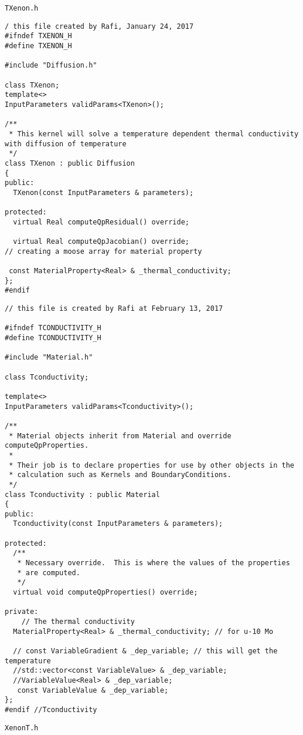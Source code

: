 \pagebreak
\texttt{TXenon.h}
\lstset{style=cpp}
\begin{lstlisting}
/ this file created by Rafi, January 24, 2017
#ifndef TXENON_H
#define TXENON_H

#include "Diffusion.h"

class TXenon;
template<>
InputParameters validParams<TXenon>();

/**
 * This kernel will solve a temperature dependent thermal conductivity with diffusion of temperature
 */
class TXenon : public Diffusion
{
public:
  TXenon(const InputParameters & parameters);

protected:
  virtual Real computeQpResidual() override;

  virtual Real computeQpJacobian() override;
// creating a moose array for material property

 const MaterialProperty<Real> & _thermal_conductivity;
};
#endif 

\end{lstlisting}
\pagebreak
\lstset{style=cpp}
\begin{lstlisting}
// this file is created by Rafi at February 13, 2017

#ifndef TCONDUCTIVITY_H
#define TCONDUCTIVITY_H

#include "Material.h"

class Tconductivity;

template<>
InputParameters validParams<Tconductivity>();

/**
 * Material objects inherit from Material and override computeQpProperties.
 *
 * Their job is to declare properties for use by other objects in the
 * calculation such as Kernels and BoundaryConditions.
 */
class Tconductivity : public Material
{
public:
  Tconductivity(const InputParameters & parameters);

protected:
  /**
   * Necessary override.  This is where the values of the properties
   * are computed.
   */
  virtual void computeQpProperties() override;

private:
    // The thermal conductivity 
  MaterialProperty<Real> & _thermal_conductivity; // for u-10 Mo

  // const VariableGradient & _dep_variable; // this will get the temperature 
  //std::vector<const VariableValue> & _dep_variable;
  //VariableValue<Real> & _dep_variable;
   const VariableValue & _dep_variable;
};
#endif //Tconductivity
\end{lstlisting}
\pagebreak
\texttt{XenonT.h}
\lstset{style=cpp}
